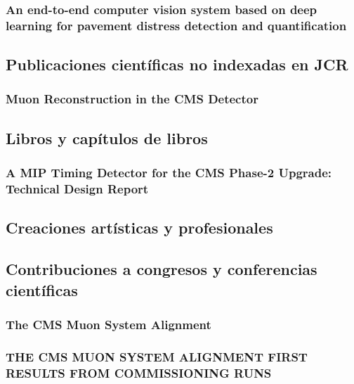 \documentclass[a4paper, 11pt, twoside, openright]{report}
\begin{document}
\subsubsection{An end-to-end computer vision system based on deep learning for pavement distress detection and quantification}
%


\subsection{Publicaciones científicas no indexadas en JCR}

\subsubsection{Muon Reconstruction in the CMS Detector}


\subsection{Libros y capítulos de libros}
\subsubsection{A MIP Timing Detector for the CMS Phase-2 Upgrade: Technical Design Report}



\subsection{Creaciones artísticas y profesionales}

\subsection{Contribuciones a congresos y conferencias científicas}

\subsubsection{The CMS Muon System Alignment}

\subsubsection{THE CMS MUON SYSTEM ALIGNMENT FIRST RESULTS FROM COMMISSIONING RUNS}

\end{document}
